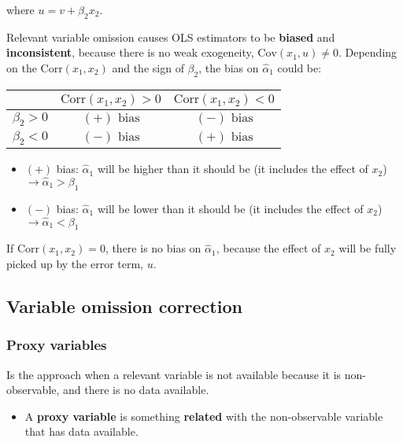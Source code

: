 \documentclass[10pt, a4paper, landscape]{extarticle}
\newcommand{\Cov}{\mathrm{Cov}}
\newcommand{\Corr}{\mathrm{Corr}}
\begin{document}
\begin{multicols}{3}
\quad where $u = v + \beta_2 x_2$.

Relevant variable omission causes OLS estimators to be \textbf{biased} and \textbf{inconsistent}, because there is no weak exogeneity, $\Cov(x_1, u) \neq 0$. Depending on the $\Corr(x_1, x_2)$ and the sign of $\beta_2$, the bias on $\hat{\alpha}_1$ could be:

\begin{center}
	\begin{tabular}{ c | c c }
		\multicolumn{1}{c|}{} & $\Corr(x_1, x_2) > 0$ & $\Corr(x_1, x_2) < 0$ \\ \hline
		$\beta_2 > 0$         & $(+) \text{ bias}$    & $(-) \text{ bias}$    \\
		$\beta_2 < 0$         & $(-) \text{ bias}$    & $(+) \text{ bias}$
	\end{tabular}
\end{center}

\begin{itemize}[leftmargin=*]
	\item $(+)$ bias: $\hat{\alpha}_1$ will be higher than it should be (it includes the effect of $x_2$) $\rightarrow \hat{\alpha}_1 > \beta_1$
	\item $(-)$ bias: $\hat{\alpha}_1$ will be lower than it should be (it includes the effect of $x_2$) $\rightarrow \hat{\alpha}_1 < \beta_1$
\end{itemize}

If $\Corr(x_1, x_2) = 0$, there is no bias on $\hat{\alpha}_1$, because the effect of $x_2$ will be fully picked up by the error term, $u$.

\columnbreak

\subsection*{Variable omission correction}

\subsubsection*{Proxy variables}

Is the approach when a relevant variable is not available because it is non-observable, and there is no data available.

\begin{itemize}[leftmargin=*]
	\item A \textbf{proxy variable} is something \textbf{related} with the non-observable variable that has data available.
\end{itemize}


\end{multicols}
\end{document}
